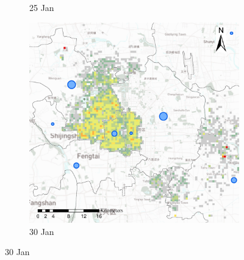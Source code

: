 \documentclass[preprints,article,accept,moreauthors,pdftex]{Definitions/mdpi}
\begin{document}
\begin{figure}[ht]
\begin{subfigure}{.3\textwidth}
        \caption{25 Jan}
    \end{subfigure}
    \begin{subfigure}{.3\textwidth}
        \includegraphics[width=\textwidth]{Figures/Relation_with_confrimed_cases/NewDistrictSSBD2020_01_30.eps}
        \caption{30 Jan}
    \end{subfigure}


\end{figure}
\end{document}
